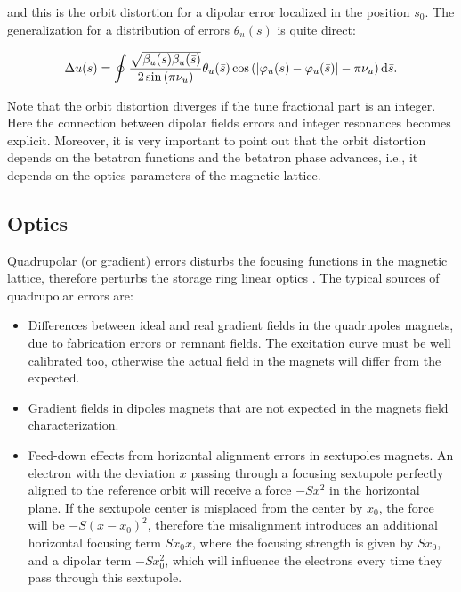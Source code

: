and this is the orbit distortion for a dipolar error localized in the position $s_0$. The generalization for a distribution of errors $\theta_u(s)$ is quite direct:

\begin{equation}
    \Delta u(s) = \oint \dfrac{\sqrt{\beta_{u}(s)\beta_{u}(\bar{s})}}{2\sin\left(\pi\nu_{u}\right)} \theta_{u}(\bar{s}) \cos\left( |\varphi_{u}(s) - \varphi_{u}(\bar{s})| - \pi\nu_{u} \right) \mathrm{d} \bar{s}.
    \label{eq:orbit_distortion}
\end{equation}

Note that the orbit distortion diverges if the tune fractional part is an integer. Here the connection between dipolar fields errors and integer resonances becomes explicit. Moreover, it is very important to point out that the orbit distortion depends on the betatron functions and the betatron phase advances, i.e., it depends on the optics parameters of the magnetic lattice.

\subsection{Optics}\label{subsec:optics}

Quadrupolar (or gradient) errors disturbs the focusing functions in the magnetic lattice, therefore perturbs the storage ring linear optics . The typical sources of quadrupolar errors are:

\begin{itemize}
    \item Differences between ideal and real gradient fields in the quadrupoles magnets, due to fabrication errors or remnant fields. The excitation curve must be well calibrated too, otherwise the actual field in the magnets will differ from the expected. 
    
    \item Gradient fields in dipoles magnets that are not expected in the magnets field characterization.
    
    \item Feed-down effects from horizontal alignment errors in sextupoles magnets. An electron with the deviation $x$ passing through a focusing sextupole perfectly aligned to the reference orbit will receive a force $-Sx^2$ in the horizontal plane. If the sextupole center is misplaced from the center by $x_0$, the force will be $-S(x - x_0)^2$, therefore the misalignment introduces an additional horizontal focusing term $ Sx_0 x$, where the focusing strength is given by $Sx_0$, and a dipolar term $-S x_0^2$, which will influence the electrons every time they pass through this sextupole.
\end{itemize}
 
